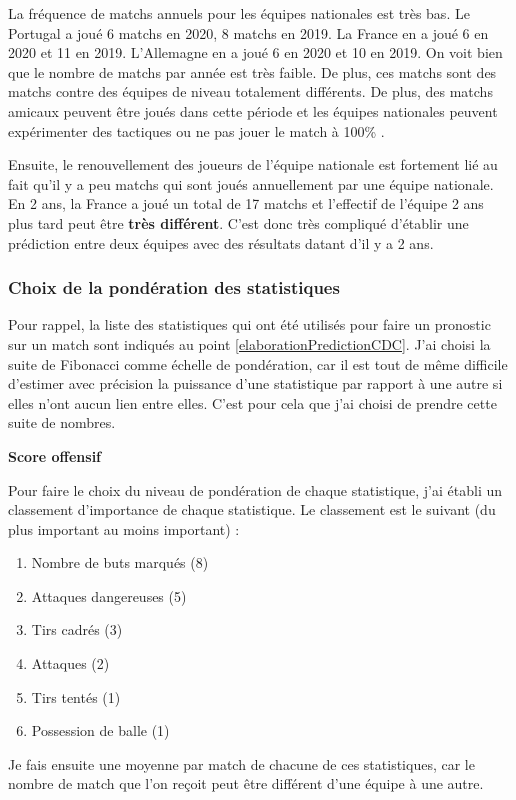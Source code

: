 \documentclass[a4paper,14pt]{extarticle}
\begin{document}
{La fréquence de matchs annuels pour les équipes nationales est très bas. Le Portugal a joué 6 matchs en 2020, 8 matchs en 2019. La France en a joué 6 en 2020 et 11 en 2019. L'Allemagne en a joué 6 en 2020 et 10 en 2019. On voit bien que le nombre de matchs par année est très faible. De plus, ces matchs sont des matchs contre des équipes de niveau totalement différents. De plus, des matchs amicaux peuvent être joués dans cette période et les équipes nationales peuvent expérimenter des tactiques ou ne pas jouer le match à 100\% .

Ensuite, le renouvellement des joueurs de l'équipe nationale est fortement lié au fait qu'il y a peu matchs qui sont joués annuellement par une équipe nationale. En 2 ans, la France a joué un total de 17 matchs et l'effectif de l'équipe 2 ans plus tard peut être \textbf{très différent}. C'est donc très compliqué d'établir une prédiction entre deux équipes avec des résultats datant d'il y a 2 ans.

\subsubsection{Choix de la pondération des statistiques}
\label{choixPondStat}

Pour rappel, la liste des statistiques qui ont été utilisés pour faire un pronostic sur un match sont indiqués au point \ref{elaborationPredictionCDC}. J'ai choisi la suite de Fibonacci comme échelle de pondération, car il est tout de même difficile d'estimer avec précision la puissance d'une statistique par rapport à une autre si elles n'ont aucun lien entre elles. C'est pour cela que j'ai choisi de prendre cette suite de nombres.

\noindent\textbf{Score offensif}

Pour faire le choix du niveau de pondération de chaque statistique, j'ai établi un classement d'importance de chaque statistique. Le classement est le suivant (du plus important au moins important) :
\begin{enumerate}
    \item Nombre de buts marqués (8)
    \item Attaques dangereuses (5)
    \item Tirs cadrés (3)
    \item Attaques (2)
    \item Tirs tentés (1)
    \item Possession de balle (1)
\end{enumerate}
Je fais ensuite une moyenne par match de chacune de ces statistiques, car le nombre de match que l'on reçoit peut être différent d'une équipe à une autre.

}
\end{document}
